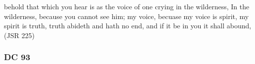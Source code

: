 \begin{compactdesc}
		\item[66$\vert$]
		\begin{compactdesc}
		\item[Original text] behold that which you hear is as the voice of one crying in the wilderness, In the wilderness, because you cannot see him; my voice, becuase my voice is spirit, my spirit is truth, truth abideth and hath no end, and if it be in you it shall abound, (JSR 225)
		\end{compactdesc}
		
		\end{compactdesc}
		
	\subsubsection{DC 93} %
	
